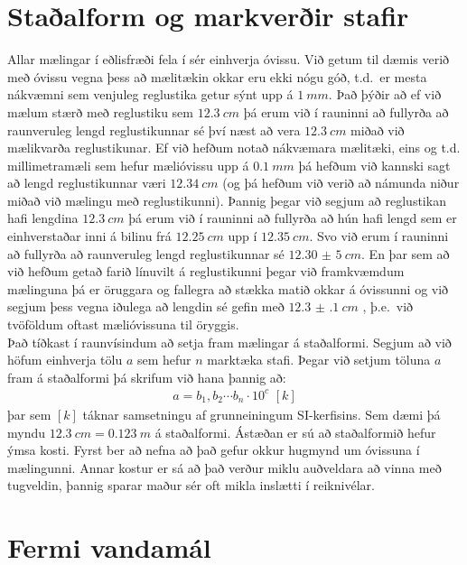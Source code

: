 \ifdefined \wholebook \else\documentclass[oneside]{book}\usepackage{EdlBook}\graphicspath{{figures/}}
\begin{document}
\section{Staðalform og markverðir stafir}

Allar mælingar í eðlisfræði fela í sér einhverja óvissu. Við getum til dæmis verið með óvissu vegna þess að mælitækin okkar eru ekki nógu góð, t.d.~er mesta nákvæmni sem venjuleg reglustika getur sýnt upp á $\SI{1}{mm}$.
Það þýðir að ef við mælum stærð með reglustiku sem $\SI{12.3}{cm}$ þá erum við í rauninni að fullyrða að raunveruleg lengd reglustikunnar sé því næst að vera $\SI{12,3}{cm}$ miðað við mælikvarða reglustikunar.
Ef við hefðum notað nákvæmara mælitæki, eins og t.d. millimetramæli sem hefur mælióvissu upp á $\SI{0.1}{mm}$ þá hefðum við kannski sagt að lengd reglustikunnar væri $\SI{12,34}{cm}$ (og þá hefðum við verið að námunda niður miðað við mælingu með reglustikunni). Þannig þegar við segjum að reglustikan hafi lengdina $\SI{12,3}{cm}$ þá erum við í rauninni að fullyrða að hún hafi lengd sem er einhverstaðar inni 
á bilinu frá $\SI{12.25}{cm}$ upp í $\SI{12.35}{cm}$. Svo við erum í rauninni að fullyrða að raunveruleg lengd reglustikunnar sé $\SI{12,30(5)}{cm}$. En þar sem að við hefðum getað farið línuvilt á reglustikunni þegar við framkvæmdum mælinguna þá er öruggara og fallegra að stækka matið okkar á óvissunni og við segjum þess vegna iðulega að lengdin sé gefin með $\SI{12.3(1)}{cm}$ , þ.e.~við tvöföldum oftast mælióvissuna til öryggis. \\

Það tíðkast í raunvísindum að setja fram mælingar á staðalformi. Segjum að við höfum einhverja tölu $a$ sem hefur $n$ marktæka stafi. Þegar við setjum töluna $a$ fram á staðalformi þá skrifum við hana þannig að:
\begin{align*}
    a = b_1, b_2 \cdots b_n \cdot 10^{c} \, \, [k]
\end{align*}
þar sem $[k]$ táknar samsetningu af grunneiningum SI-kerfisins. Sem dæmi þá myndu $\SI{12,3}{cm} = \SI{0,123}{m}$ á staðalformi. Ástæðan er sú að staðalformið hefur ýmsa kosti. Fyrst ber að nefna að það gefur okkur hugmynd um óvissuna í mælingunni. Annar kostur er sá að það verður miklu auðveldara að vinna með tugveldin, þannig sparar maður sér oft mikla inslætti í reiknivélar.

\section{Fermi vandamál}
\end{document}
